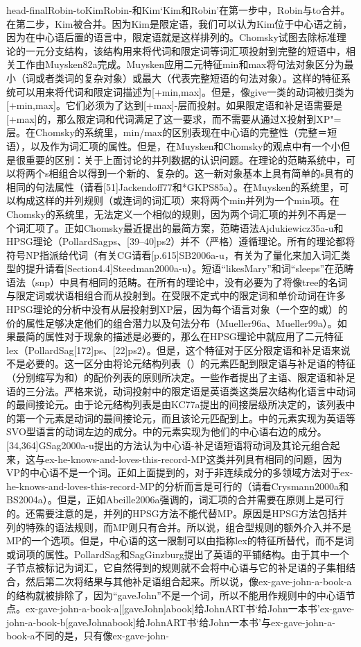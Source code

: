 head-finalRobin-toKimRobin-和Kim`Kim和Robin'在第一步中，Robin与to合并。在第二步，Kim被合并。因为Kim是限定语，我们可以认为Kim位于中心语之前，因为在中心语后置的语言中，限定语就是这样排列的。Chomsky试图去除标准理论的一元分支结构，该结构用来将代词和限定词等词汇项投射到完整的短语中，相关工作由Muysken82a完成。Muysken应用二元特征min和max将句法对象区分为最小（词或者类词的复杂对象）或最大（代表完整短语的句法对象）。这样的特征系统可以用来将代词和限定词描述为[+min,max]。但是，像give一类的动词被归类为[+min,max]。它们必须为了达到[+max]-层而投射。如果限定语和补足语需要是[+max]的，那么限定词和代词满足了这一要求，而不需要从通过X投射到XP"=层。在Chomsky的系统里，min/max的区别表现在中心语的完整性（完整＝短语），以及作为词汇项的属性。但是，在Muysken和Chomsky的观点中有一个小但是很重要的区别：关于上面讨论的并列数据的认识问题。在理论的范畴系统中，可以将两个s相组合以得到一个新的、复杂的。这一新对象基本上具有简单的s具有的相同的句法属性（请看[51]Jackendoff77和*GKPS85a）。在Muysken的系统里，可以构成这样的并列规则（或连词的词汇项）来将两个min并列为一个min项。在Chomsky的系统里，无法定义一个相似的规则，因为两个词汇项的并列不再是一个词汇项了。正如Chomsky最近提出的最简方案，范畴语法Ajdukiewicz35a-u和HPSG理论（PollardSagps、[39--40]ps2）并不（严格）遵循理论。所有的理论都将符号NP指派给代词（有关CG请看[p.615]SB2006a-u，有关为了量化来加入词汇类型的提升请看[Section4.4]Steedman2000a-u）。短语“likesMary”和词“sleeps”在范畴语法（snp）中具有相同的范畴。在所有的理论中，没有必要为了将像tree的名词与限定词或状语相组合而从投射到。在受限不定式中的限定词和单价动词在许多HPSG理论的分析中没有从层投射到XP层，因为每个语言对象（一个空的或）的价的属性足够决定他们的组合潜力以及句法分布（Mueller96a、Mueller99a）。如果最简的属性对于现象的描述是必要的，那么在HPSG理论中就应用了二元特征lex（PollardSag[172]ps、[22]ps2）。但是，这个特征对于区分限定语和补足语来说不是必要的。这一区分由将论元结构列表（）的元素匹配到限定语与补足语的特征（分别缩写为和）的配价列表的原则所决定。一些作者提出了主语、限定语和补足语的三分法。严格来说，动词投射中的限定语是英语类这类层次结构化语言中动词的最间接论元。由于论元结构列表是由KC77a提出的间接层级所决定的，该列表中的第一个元素是动词的最间接论元，而且该论元匹配到上。中的元素实现为英语等SVO型语言的动词左边的成分。中的元素实现为他们的中心语右边的成分。[34,364]GSag2000a-u提出的方法认为中心语-补足语短语将动词及其论元组合起来，这与ex-he-knows-and-loves-this-record-MP这类并列具有相同的问题，因为VP的中心语不是一个词。正如上面提到的，对于非连续成分的多领域方法对于ex-he-knows-and-loves-this-record-MP的分析而言是可行的（请看Crysmann2000a和BS2004a）。但是，正如Abeille2006a强调的，词汇项的合并需要在原则上是可行的。还需要注意的是，并列的HPSG方法不能代替MP。原因是HPSG方法包括并列的特殊的语法规则，而MP则只有合并。所以说，组合型规则的额外介入并不是MP的一个选项。但是，中心语的这一限制可以由指称lex的特征所替代，而不是词或词项的属性。PollardSag和SagGinzburg提出了英语的平铺结构。由于其中一个子节点被标记为词汇，它自然得到的规则就不会将中心语与它的补足语的子集相结合，然后第二次将结果与其他补足语组合起来。所以说，像ex-gave-john-a-book-a的结构就被排除了，因为“gaveJohn”不是一个词，所以不能用作规则中的中心语节点。ex-gave-john-a-book-a[[gaveJohn]abook]给JohnART书`给John一本书'ex-gave-john-a-book-b[gaveJohnabook]给JohnART书`给John一本书'与ex-gave-john-a-book-a不同的是，只有像ex-gave-john-